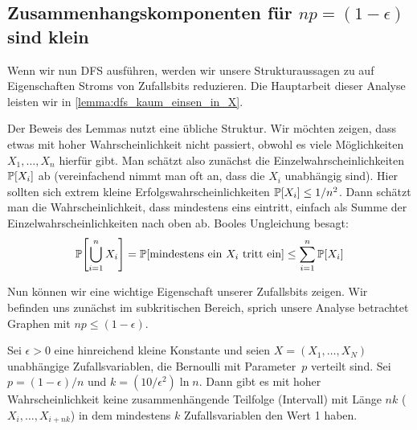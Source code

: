\subsection{Zusammenhangskomponenten für $np = (1-\epsilon)$ sind klein}
Wenn wir nun DFS ausführen, werden wir unsere Strukturaussagen zu \Gnp auf Eigenschaften Stroms von Zufallsbits reduzieren.
Die Hauptarbeit dieser Analyse leisten wir in \cref{lemma:dfs_kaum_einsen_in_X}.

Der  Beweis des Lemmas nutzt eine übliche Struktur.
Wir möchten zeigen, dass etwas mit hoher Wahrscheinlichkeit nicht passiert, obwohl es viele Möglichkeiten $X_1, \ldots, X_n$ hierfür gibt.
Man schätzt also zunächst die Einzelwahrscheinlichkeiten~$\mathbb{P}\!\left[X_i\right]$ ab (vereinfachend nimmt man oft an, dass die $X_i$ unabhängig sind).
Hier sollten sich extrem kleine Erfolgswahrscheinlichkeiten $\mathbb{P}\!\left[X_i\right] \le 1/n^2$.
Dann schätzt man die Wahrscheinlichkeit, dass mindestens eins eintritt, einfach als Summe der Einzelwahrscheinlichkeiten nach oben ab.
Booles  Ungleichung besagt:
\begin{align}
    \mathbb{P}\!\left[\bigcup_{i=1}^n X_i\right] = \mathbb{P}\!\left[\text{mindestens ein $X_i$ tritt ein}\right] \le \sum_{i=1}^n \mathbb{P}\!\left[X_i\right]
\end{align}

\noindent
Nun können wir eine wichtige Eigenschaft unserer Zufallsbits zeigen.
Wir befinden uns zunächst im subkritischen Bereich, sprich unsere Analyse betrachtet Graphen mit $np \le (1 - \epsilon)$.

\begin{lemma}\label{lemma:dfs_kaum_einsen_in_X}
    Sei $\epsilon > 0$  eine hinreichend kleine Konstante und seien $X = (X_1, \ldots, X_N)$ unabhängige Zufallsvariablen, die Bernoulli mit Parameter~$p$ verteilt sind.
    Sei $p = (1 - \epsilon) / n$ und $k = (10 / \epsilon^2) \ln n$.
    Dann gibt es mit hoher Wahrscheinlichkeit keine zusammenhängende Teilfolge (Intervall) mit Länge $nk$ (\dh $X_i, \ldots, X_{i+nk}$) in dem mindestens $k$ Zufallsvariablen den Wert 1 haben.

\end{lemma}

